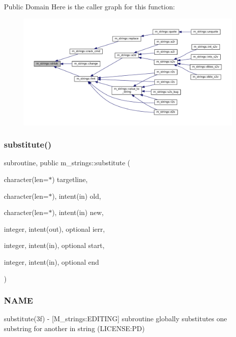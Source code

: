 Public Domain Here is the caller graph for this function\+:\nopagebreak
\begin{figure}[H]
\begin{center}
\leavevmode
\includegraphics[width=350pt]{namespacem__strings_aa53af9135873e241c487a75a7073bda1_icgraph}
\end{center}
\end{figure}
\mbox{\label{namespacem__strings_ab84a4b7c2be211433c2d1b435a87fa32}} 
\subsubsection{\texorpdfstring{substitute()}{substitute()}}
{\footnotesize\ttfamily subroutine, public m\+\_\+strings\+::substitute (\begin{DoxyParamCaption}\item[{character(len=$\ast$)}]{targetline,  }\item[{character(len=$\ast$), intent(in)}]{old,  }\item[{character(len=$\ast$), intent(in)}]{new,  }\item[{integer, intent(out), optional}]{ierr,  }\item[{integer, intent(in), optional}]{start,  }\item[{integer, intent(in), optional}]{end }\end{DoxyParamCaption})}



\subsubsection*{N\+A\+ME}

substitute(3f) -\/ \mbox{[}M\+\_\+strings\+:E\+D\+I\+T\+I\+NG\mbox{]} subroutine globally substitutes one substring for another in string (L\+I\+C\+E\+N\+SE\+:PD) 

